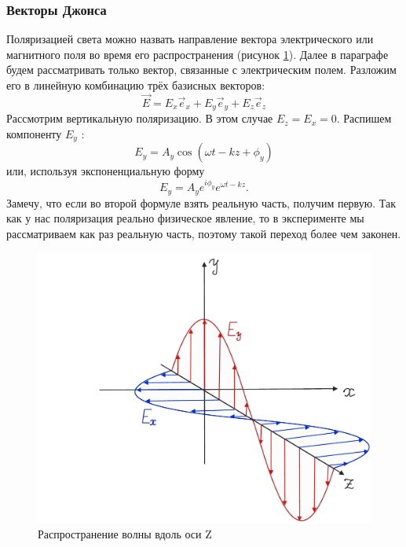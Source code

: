 \subsubsection{Векторы Джонса}
Поляризацией света можно назвать направление вектора электрического или магнитного поля во время его распространения (рисунок \ref{fig B.4}). Далее в параграфе будем рассматривать только вектор, связанные с электрическим полем. Разложим его в линейную комбинацию трёх базисных векторов:
\[
\Vec{E} = E_x \Vec{e}_x + E_y \Vec{e}_y + E_z \Vec{e}_z
\]
Рассмотрим вертикальную поляризацию. В этом случае $E_z = E_x = 0$. Распишем компоненту $E_y$ :
\[
E_y = A_y \cos(\omega t - kz + \phi_y)
\]
или, используя экспоненциальную форму
\[
E_y = A_y e^{i\phi_y}e^{\omega t - kz}.
\]
Замечу, что если во второй формуле взять реальную часть, получим первую. Так как у нас поляризация реально физическое явление, то в эксперименте мы рассматриваем как раз реальную часть, поэтому такой переход более чем законен.
\begin{figure}[!ht]
\centering
\includegraphics[scale=0.23]{appendix/images/polarization.png}
\caption{Распространение волны вдоль оси Z}
\label{fig B.4}
\end{figure}

